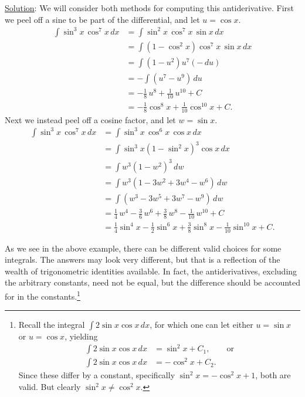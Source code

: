 \underline{Solution}:  We will consider both methods for computing
this antiderivative.  First we peel off a sine to be part of
the differential, and let $u=\cos x$.
\begin{align*}
\int\sin^3x\,\cos^7x\,dx&=\int\sin^2x\,\cos^7x\,\sin x\,dx\\
                      &=\int\left(1-\cos^2x\right)\cos^7x\,\sin x\,dx\\
                      &=\int\left(1-u^2\right)u^7(-\,du)\\
                      &=-\int\left(u^7-u^9\right)\,du\\
                      &=-\frac18\,u^8+\frac1{10}\,u^{10}+C\\
                      &=-\frac18\cos^8x+\frac1{10}\cos^{10}x+C.
\end{align*}
Next we instead peel off a cosine factor, and let $w=\sin x$.
\begin{align*}
\int\sin^3x\,\cos^7x\,dx&=\int\sin^3x\,\cos^6x\,\cos x\,dx\\
        &=\int\sin^3x\left(1-\sin^2x\right)^3\cos x\,dx\\
        &=\int w^3\left(1-w^2\right)^3\,dw\\
        &=\int w^3\left(1-3w^2+3w^4-w^6\right)\,dw\\
        &=\int\left(w^3-3w^5+3w^7-w^9\right)\,dw\\
        &=\frac14\,w^4-\frac36\,w^6+\frac38\,w^8-\frac1{10}\,w^{10}+C\\
        &=\frac14\sin^4x-\frac12\sin^6x+\frac38\sin^8x-\frac1{10}\sin^{10}x+C.
\end{align*}
\eex

As we see in the above example, there can be different valid choices for
some integrals.  The answers may look very different, but 
that is a reflection of the wealth of trigonometric identities 
available.  In fact, the antiderivatives, excluding the arbitrary
constants, need not be equal, but the difference should be 
accounted for in the constants.\footnote{%
Recall the integral $\int2\sin x\cos x\,dx$, for which one
can let either $u=\sin x$ or $u=\cos x$, yielding
\begin{align*}
\int2\sin x\cos x\,dx&=\sin^2x+C_1,\qquad\text{or}\\
\int2\sin x\cos x\,dx&=-\cos^2x+C_2.\end{align*}
Since these differ by a constant, specifically
$\sin^2x=-\cos^2x+1$, both are valid.  But clearly
$\sin^2x\ne\cos^2x$.
}




